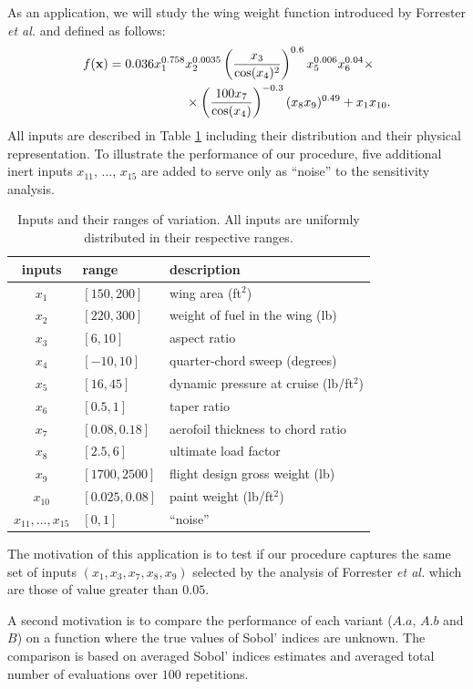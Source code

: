 As an application, we will study the wing weight function introduced by Forrester \textit{et al.} \cite{Forrester} and defined as follows:
\begin{align*}
f(\boldsymbol{\mathbf{x}})=0.036 x_1^{0.758} & x_2^{0.0035} \left(\frac{x_3}{\cos(x_4)^2}\right)^{0.6} x_5^{0.006} x_6^{0.04}\times \\
 & \times\left(\frac{100 x_7}{\cos(x_4)}\right)^{-0.3} (x_8 x_9)^{0.49} + x_1 x_{10}.
\end{align*}
All inputs are described in Table \ref{wing_inputs_table} including their distribution and their physical representation. To illustrate the performance of our procedure, five additional inert inputs $x_{11}$, $\dots$, $x_{15}$ are added to serve only as ``noise'' to the sensitivity analysis.
\begin{table}[t]
\caption{Inputs and their ranges of variation. All inputs are uniformly distributed in their respective ranges.}
\centering
\begin{tabular}{cll}
\hline
 inputs & range & description \\ \hline
$x_1$ & $[150, 200]$ & wing area (ft$^2$) \\
$x_2$ & $[220, 300]$ & weight of fuel in the wing (lb) \\
$x_3$ & $[6, 10]$ & aspect ratio \\
$x_4$ & $[-10, 10]$ & quarter-chord sweep (degrees) \\
$x_5$ & $[16, 45]$ & dynamic pressure at cruise (lb/ft$^2$) \\
$x_6$ & $[0.5, 1]$ & taper ratio \\
$x_7$ & $[0.08, 0.18]$ & aerofoil thickness to chord ratio \\
$x_8$ & $[2.5, 6]$ & ultimate load factor \\
$x_9$ & $[1700, 2500]$ & flight design gross weight (lb) \\
$x_{10}$ & $[0.025, 0.08]$ & paint weight (lb/ft$^2$) \\
$x_{11},\dots,x_{15}$ & $[0,1]$ & ``noise'' \\
\hline
\end{tabular}
\label{wing_inputs_table}
\end{table}

The motivation of this application is to test if our procedure captures the same set of  inputs $(x_1,x_3,x_7,x_8,x_9)$ selected by the analysis of Forrester \textit{et al.} which are those of value greater than $0.05$.

A second motivation is to compare the performance of each variant ($A.a$, $A.b$ and $B$) on a function where the true values of Sobol' indices are unknown. The comparison is based on averaged Sobol' indices estimates and averaged total number of evaluations over $100$ repetitions.
\bigskip


